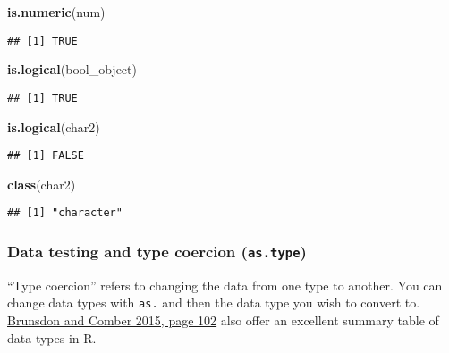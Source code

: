 \documentclass[]{article}
\newenvironment{Shaded}{\begin{snugshade}}{\end{snugshade}}
\newcommand{\KeywordTok}[1]{\textcolor[rgb]{0.13,0.29,0.53}{\textbf{#1}}}
\newcommand{\NormalTok}[1]{#1}
\begin{document}
\begin{Shaded}
\begin{Highlighting}[]
\KeywordTok{is.numeric}\NormalTok{(num) }
\end{Highlighting}
\end{Shaded}

\begin{verbatim}
## [1] TRUE
\end{verbatim}

\begin{Shaded}
\begin{Highlighting}[]
\KeywordTok{is.logical}\NormalTok{(bool_object)}
\end{Highlighting}
\end{Shaded}

\begin{verbatim}
## [1] TRUE
\end{verbatim}

\begin{Shaded}
\begin{Highlighting}[]
\KeywordTok{is.logical}\NormalTok{(char2)}
\end{Highlighting}
\end{Shaded}

\begin{verbatim}
## [1] FALSE
\end{verbatim}

\begin{Shaded}
\begin{Highlighting}[]
\KeywordTok{class}\NormalTok{(char2)}
\end{Highlighting}
\end{Shaded}

\begin{verbatim}
## [1] "character"
\end{verbatim}

\subsubsection{\texorpdfstring{Data testing and type coercion
(\texttt{as.type})}{Data testing and type coercion (as.type)}}\label{data-testing-and-type-coercion-as.type}

``Type coercion'' refers to changing the data from one type to another.
You can change data types with \texttt{as.} and then the data type you
wish to convert to.\\
\href{https://us.sagepub.com/en-us/nam/an-introduction-to-r-for-spatial-analysis-and-mapping/book241031}{Brunsdon
and Comber 2015, page 102} also offer an excellent summary table of data
types in R.
\end{document}
